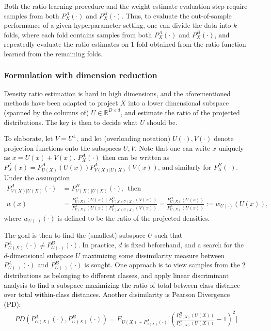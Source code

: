 \documentclass[8pt]{article}
\begin{document}
Both the ratio-learning procedure and the weight estimate evaluation
step require samples from both $P_X^A(\cdot)$ and $P_X^B(\cdot)$.
Thus, to evaluate the out-of-sample performance of a given
hyperparameter setting, one can divide the data into $k$
folds, where each fold contains samples from both $P_X^A(\cdot)$ and
$P_X^B(\cdot)$, and repeatedly evaluate the ratio estimates on 1 fold
obtained from the ratio function learned from the remaining folds.

\subsubsection{Formulation with dimension reduction}\label{sec:dim_reduction}
Density ratio estimation is hard in high dimensions, and the
aforementioned methods have been adapted to project $X$ into a lower
dimensional subspace (spanned by the
columns of) $U \in
\mathbb{R}^{D\times d}$, and estimate the ratio of the projected
distributions.  The key is then to decide what $U$
should be.

To elaborate, let $V=U^\perp$, and let (overloading notation) $U(\cdot),V(\cdot)$ denote
projection functions onto the subspaces $U,V$.  Note that one can write $x$ uniquely as $x=U(x) +
V(x)$.  $P_X^A(\cdot)$ then can
be written as $P_X^A(x) =
P_{U(X)}^A(U(x))P_{V(X)|U(X)}^A(V(x))$,
and similarly for $P_X^B(\cdot).$  Under the assumption
\begin{align}
P_{V(X)|U(X)}^A(\cdot)&=P_{V(X)|U(X)}^B(\cdot),\ \ \text{then}\\
w(x) &=
\frac{P_{U(X)}^B(U(x))P_{V(X)|U(X)}^B(V(x))}{P_{U(X)}^A(U(x))P_{V(X)|U(X)}^A(V(x))}
=
\frac{P_{U(X)}^B(U(x))}{P_{U(X)}^A(U(x))}
:= w_{U(\cdot)}(U(x)),\label{eq:projected_ratio}
\end{align}
where $w_{U(\cdot)}(\cdot)$ is defined to be the ratio of the
projected densities. 

The goal is then to find the (smallest) subspace $U$ such that
$P_{U(X)}^A(\cdot) \neq P_{U(\cdot)}^B(\cdot)$.  In practice, $d$ is fixed
beforehand, and a search for the $d$-dimensional subspace $U$
maximizing some dissimilarity measure between $P_{U(\cdot)}^A(\cdot)$ and
$P_{U(\cdot)}^B(\cdot)$ is sought.  One approach is to view samples from the 2
distributions as belonging to different classes, and apply linear
discriminant analysis to find a subspace maximizing the ratio of
total between-class distance over total within-class distances.
Another disimilarity is Pearson Divergence
(PD):
\begin{align}
  PD(P_{U(X)}^A(\cdot),P_{U(X)}^B(\cdot)) = E_{U(X) \sim P_{U(X)}^A(\cdot)}\Big[(\tfrac{P_{U(X)}^B(U(X))}{P_{U(X)}^A(U(X))}-1)^2\Big]\label{eq:pearson_div}
\end{align}
\end{document}
